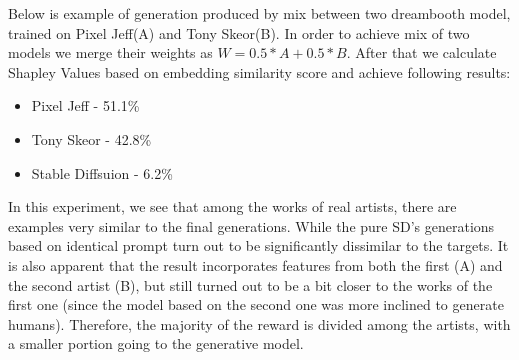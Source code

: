 \documentclass[12pt, letterpaper]{article}
\begin{document}
Below is example of generation produced by mix between two dreambooth model, trained on Pixel Jeff(A) and  Tony Skeor(B). In order to achieve mix of two models we merge their weights as \(W = 0.5 * A + 0.5 * B\). After that we calculate Shapley Values based on embedding similarity score and achieve following results:
\begin{itemize}[itemsep=0pt,topsep=5pt,partopsep=0pt]
    \item Pixel Jeff - 51.1\%
    \item Tony Skeor - 42.8\%
    \item Stable Diffsuion - 6.2\%
\end{itemize}

In this experiment, we see that among the works of real artists, there are examples very similar to the final generations. While the pure SD's generations based on identical prompt turn out to be significantly dissimilar to the targets. It is also apparent that the result incorporates features from both the first (A) and the second artist (B), but still turned out to be a bit closer to the works of the first one (since the model based on the second one was more inclined to generate humans). Therefore, the majority of the reward is divided among the artists, with a smaller portion going to the generative model.
\end{document}
